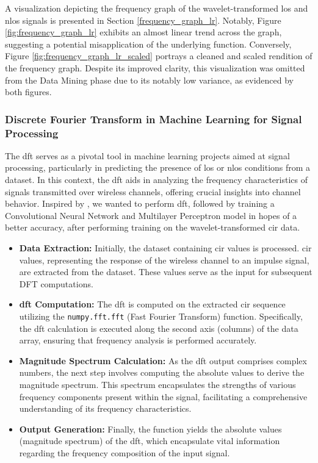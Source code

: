 A visualization depicting the frequency graph of the wavelet-transformed \acrshort{los} and \acrshort{nlos} signals is presented in Section \ref{frequency_graph_lr}. Notably, Figure \ref{fig:frequency_graph_lr} exhibits an almost linear trend across the graph, suggesting a potential misapplication of the underlying function. Conversely, Figure \ref{fig:frequency_graph_lr_scaled} portrays a cleaned and scaled rendition of the frequency graph. Despite its improved clarity, this visualization was omitted from the Data Mining phase due to its notably low variance, as evidenced by both figures.

\subsubsection{\Gls{Discrete Fourier Transform} in Machine Learning for Signal Processing}

The \acrshort{dft} serves as a pivotal tool in machine learning projects aimed at signal processing, particularly in predicting the presence of \acrshort{los} or \acrshort{nlos} conditions from a dataset. In this context, the \acrshort{dft} aids in analyzing the frequency characteristics of signals transmitted over wireless channels, offering crucial insights into channel behavior. Inspired by \cite{8682194}, we wanted to perform \acrshort{dft}, followed by training a \Gls{Convolutional Neural Network} and \Gls{Multilayer Perceptron} model in hopes of a better accuracy, after performing training on the wavelet-transformed \acrshort{cir} data.

\begin{itemize}
    \item \textbf{Data Extraction:} Initially, the dataset containing \acrshort{cir} values is processed. \acrshort{cir} values, representing the response of the wireless channel to an impulse signal, are extracted from the dataset. These values serve as the input for subsequent DFT computations.
    
    \item \textbf{\acrshort{dft} Computation:} The \acrshort{dft} is computed on the extracted \acrshort{cir} sequence utilizing the \texttt{numpy.fft.fft} (Fast Fourier Transform) function. Specifically, the \acrshort{dft} calculation is executed along the second axis (columns) of the data array, ensuring that frequency analysis is performed accurately.
    
    \item \textbf{Magnitude Spectrum Calculation:} As the \acrshort{dft} output comprises complex numbers, the next step involves computing the absolute values to derive the magnitude spectrum. This spectrum encapsulates the strengths of various frequency components present within the signal, facilitating a comprehensive understanding of its frequency characteristics.
    
    \item \textbf{Output Generation:} Finally, the function yields the absolute values (magnitude spectrum) of the \acrshort{dft}, which encapsulate vital information regarding the frequency composition of the input signal.
\end{itemize}

